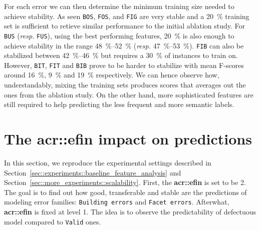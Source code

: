         For each error we can then determine the minimum training size needed to achieve stability.
        As seen \texttt{BOS}, \texttt{FOS}, and \texttt{FIG} are very stable and a \SI{20}{\percent} training set is sufficient to retieve similar performance to the initial ablation study.
        For \texttt{BUS} (\textit{resp.} \texttt{FUS}), using the best performing features, \SI{20}{\percent} is also enough to achieve stability in the range \SIrange{48}{52}{\percent} (\textit{resp.} \SIrange{47}{53}{\percent}).
        \texttt{FIB} can also be stabilized between \SIrange[range-phrase={ and }]{42}{46}{\percent} but requires a \SI{30}{\percent} of instances to train on.
        However, \texttt{BIT}, \texttt{FIT} and \texttt{BIB} prove to be harder to stabilize with mean F-scores around \SI{16}{\percent}, \SI{9}{\percent} and \SI{19}{\percent} respectively.
        We can hence observe how, understandably, mixing the training sets produces scores that averages out the ones from the ablation study.
        On the other hand, more sophisticated features are still required to help predicting the less frequent and more semantic labels.
    
\section{The \texorpdfstring{\acrlong*{acr::efin}}{eFin} impact on predictions}
    \label{sec::more_experiments::finesse}
    In this section, we reproduce the experimental settings described in Section~\ref{sec::experiments::baseline_feature_analysis} and Section~\ref{sec::more_experiments::scalability}.
    First, the \textbf{\gls{acr::efin}} is set to be 2.
    The goal is to find out how good, transferable and stable are the predictions of modeling error families: \texttt{Building errors} and \texttt{Facet errors}.
    Afterwhat, \textbf{\gls{acr::efin}} is fixed at level 1.
    The idea is to observe the predictability of defectuous model compared to \texttt{Valid} ones.
    
